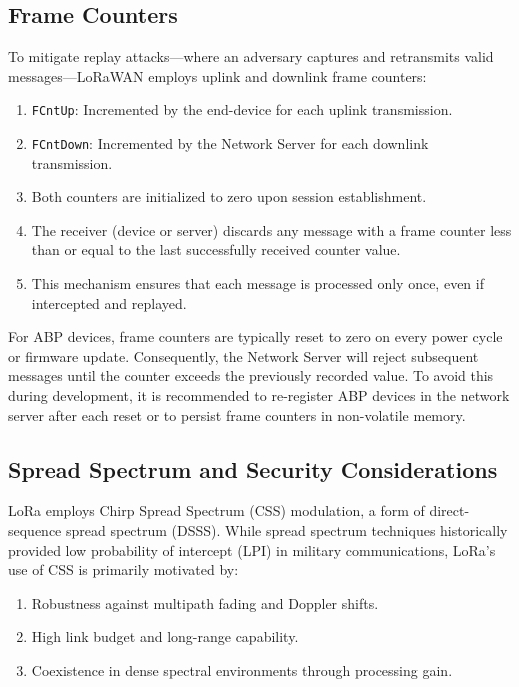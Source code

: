 \subsection{Frame Counters}

To mitigate replay attacks—where an adversary captures and retransmits valid messages—LoRaWAN employs uplink and downlink frame counters:

\begin{enumerate}
    \item \texttt{FCntUp}: Incremented by the end-device for each uplink transmission.
    \item \texttt{FCntDown}: Incremented by the Network Server for each downlink transmission.
    \item Both counters are initialized to zero upon session establishment.
    \item The receiver (device or server) discards any message with a frame counter less than or equal to the last successfully received counter value.
    \item This mechanism ensures that each message is processed only once, even if intercepted and replayed.
\end{enumerate}

For ABP devices, frame counters are typically reset to zero on every power cycle or firmware update. Consequently, the Network Server will reject subsequent messages until the counter exceeds the previously recorded value. To avoid this during development, it is recommended to re-register ABP devices in the network server after each reset or to persist frame counters in non-volatile memory.

\subsection{Spread Spectrum and Security Considerations}

LoRa employs Chirp Spread Spectrum (CSS) modulation, a form of direct-sequence spread spectrum (DSSS). While spread spectrum techniques historically provided low probability of intercept (LPI) in military communications, LoRa’s use of CSS is primarily motivated by:

\begin{enumerate}
    \item Robustness against multipath fading and Doppler shifts.
    \item High link budget and long-range capability.
    \item Coexistence in dense spectral environments through processing gain.
\end{enumerate}

